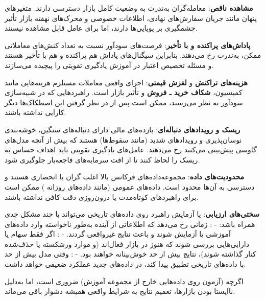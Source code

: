 \documentclass[12pt, a4paper]{report}
\begin{document}
\bigskip
\textbf{مشاهده ناقص}:  
معامله‌گران به‌ندرت به وضعیت کامل بازار دسترسی دارند. متغیرهای پنهان مانند جریان سفارش‌های نهادی، اطلاعات خصوصی و محرک‌های نهفته بازار تأثیر چشمگیری بر پویایی‌ها دارند، اما برای عامل قابل مشاهده نیستند.  

\bigskip
\textbf{پاداش‌های پراکنده و با تأخیر}:  
فرصت‌های سودآور نسبت به تعداد کنش‌های معاملاتی ممکن، به‌ندرت رخ می‌دهند. بنابراین سیگنال‌های پاداش هم پراکنده و هم با تأخیر هستند و مسئله تخصیص اعتبار در آموزش یادگیری تقویتی را پیچیده می‌سازند.  

\bigskip
\textbf{هزینه‌های تراکنش} و \textbf{لغزش قیمتی}:
اجرای واقعی معاملات مستلزم هزینه‌هایی مانند کمیسیون، \textbf{شکاف خرید ـ فروش} و تأثیر بازار است. راهبردهایی که در شبیه‌سازی سودآور به نظر می‌رسند، ممکن است پس از در نظر گرفتن این اصطکاک‌ها دیگر کارایی نداشته باشند.  

\bigskip
\textbf{ریسک و رویدادهای دنباله‌ای}:  
بازده‌های مالی دارای دنباله‌های سنگین، خوشه‌بندی نوسان‌پذیری و رویدادهای شدید (مانند سقوط‌ها) هستند که بیش از آنچه مدل‌های گاوسی پیش‌بینی می‌کنند رخ می‌دهند. عامل‌های یادگیری تقویتی باید اهداف حساس به ریسک را لحاظ کنند تا از افت سرمایه‌های فاجعه‌بار جلوگیری شود.  

\bigskip
\textbf{محدودیت‌های داده}:  
مجموعه‌داده‌های فرکانس بالا اغلب گران یا انحصاری هستند و دسترسی به آن‌ها محدود است. داده‌های عمومی (مانند داده‌های روزانه ) ممکن است برای راهبردهای کوتاه‌مدت یا درون‌روزی دقت کافی نداشته باشند.  

\bigskip

\textbf{سختی‌های ارزیابی}:  
 یا آزمایش راهبرد روی داده‌های تاریخی می‌تواند با چند مشکل جدی همراه باشد:  
- \textbf{}: زمانی رخ می‌دهد که اطلاعاتی از آینده به‌طور ناخواسته وارد داده‌های آموزشی یا آزمایش شوند و باعث نتایج غیرواقعی گردند.  
- \textbf{}: اگر فقط سهام یا دارایی‌هایی بررسی شوند که هنوز در بازار فعال‌اند (و موارد ورشکسته یا حذف‌شده کنار گذاشته شوند)، نتایج بیش از حد خوش‌بینانه خواهند بود.  
- \textbf{}: وقتی مدل بیش از حد با داده‌های تاریخی تطبیق پیدا کند، در داده‌های جدید عملکرد ضعیفی خواهد داشت.  

اگرچه  (آزمون روی داده‌هایی خارج از مجموعه آموزش) ضروری است، اما به‌دلیل ناایستا بودن بازارها، تعمیم نتایج به شرایط واقعی همیشه دشوار باقی می‌ماند.
\end{document}

